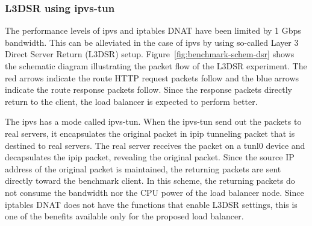 
\FloatBarrier

\subsubsection{L3DSR using ipvs-tun}

The performance levels of ipvs and iptables DNAT have been limited by 1 Gbps bandwidth.
This can be alleviated in the case of ipvs by using so-called Layer 3 Direct Server Return (L3DSR) setup.
Figure~\ref{fig:benchmark-schem-dsr} shows the schematic diagram illustrating the packet flow of the L3DSR experiment.
The red arrows indicate the route HTTP request packets follow and the blue arrows indicate the route response packets follow.
Since the response packets directly return to the client, the load balancer is expected to perform better.

The ipvs has a mode called ipvs-tun.
When the ipvs-tun send out the packets to real servers, it encapsulates the original packet in ipip tunneling packet that is destined to real servers.
The real server receives the packet on a tunl0 device and decapsulates the ipip packet, revealing the original packet.
Since the source IP address of the original packet is maintained, the returning packets are sent directly toward the benchmark client.
In this scheme, the returning packets do not consume the bandwidth nor the CPU power of the load balancer node.
Since iptables DNAT does not have the functions that enable L3DSR settings, this is one of the benefits available only for the proposed load balancer.

